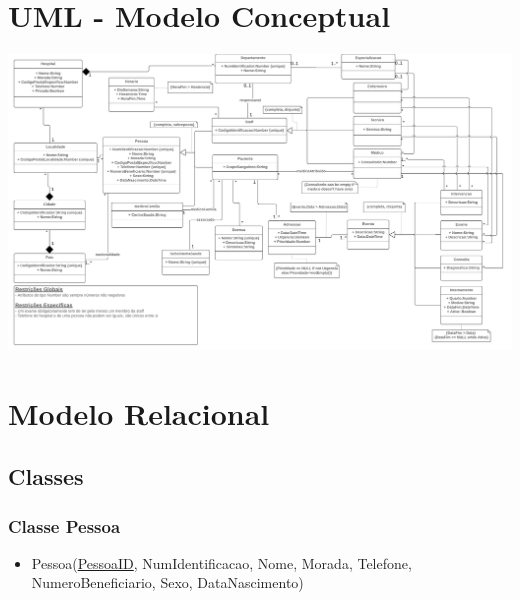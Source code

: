\documentclass[article, a4paper, 12pt, oneside]{memoir}
\begin{document}
\newpage
\chapter[UML - Modelo Conceptual][UML]{UML - Modelo Conceptual} \label{\thechapter}
\hspace*{-1.3cm}\includegraphics[width=1.1\linewidth, height=1.0\linewidth]{BDAD-UML.png}

\newpage
\chapter[Modelo Relacional][Modelo Relacional]{Modelo Relacional} \label{\thechapter}

\section{Classes}
\subsection{Classe Pessoa}
\begin{itemize}
	\item Pessoa(\underline{PessoaID}, NumIdentificacao, Nome, Morada, Telefone, NumeroBeneficiario, Sexo, DataNascimento)
\end{itemize}
\end{document}
